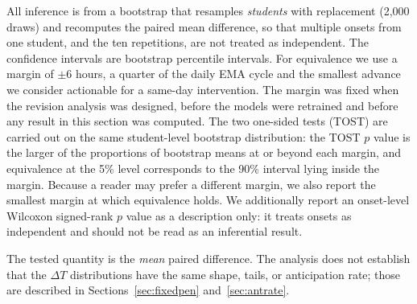 \documentclass[preprint,12pt,authoryear]{elsarticle}
\newcommand{\dt}{$\Delta T$}
\begin{document}
All inference is from a bootstrap that resamples \emph{students} with
replacement (2{,}000 draws) and recomputes the paired mean difference,
so that multiple onsets from one student, and the ten repetitions,
are not treated as independent. The confidence intervals are bootstrap
percentile intervals. For equivalence we use a margin of $\pm 6$ hours,
a quarter of the daily EMA cycle and the smallest advance we consider
actionable for a same-day intervention. The margin was fixed when the
revision analysis was designed, before the models were retrained and
before any result in this section was computed. The two one-sided
tests (TOST) are carried out on the same student-level bootstrap
distribution: the TOST $p$ value is the larger of the proportions of
bootstrap means at or beyond each margin, and equivalence at the 5\%
level corresponds to the 90\% interval lying inside the margin. Because
a reader may prefer a different margin, we also report the smallest
margin at which equivalence holds. We additionally report an
onset-level Wilcoxon signed-rank $p$ value as a description only: it
treats onsets as independent and should not be read as an inferential
result.

The tested quantity is the \emph{mean} paired difference. The analysis
does not establish that the \dt{} distributions have the same shape,
tails, or anticipation rate; those are described in
Sections~\ref{sec:fixedpen} and~\ref{sec:antrate}.

\begin{table}[h]
\centering
\caption{Onset-paired comparisons of \dt{} between models. The paired
difference is row model minus column model, in hours, with 95\%
student-clustered bootstrap confidence intervals. Equivalence is
assessed by TOST at the pre-specified $\pm 6$-hour margin; the final
column gives the smallest margin at which equivalence holds (the larger
absolute bound of the 90\% CI). The TOST $p$ value and the intervals
come from the student-level bootstrap; the Wilcoxon $p$ value is
onset-level and descriptive.}
\label{tab:paired}
\small
{}
\end{table}
\end{document}
